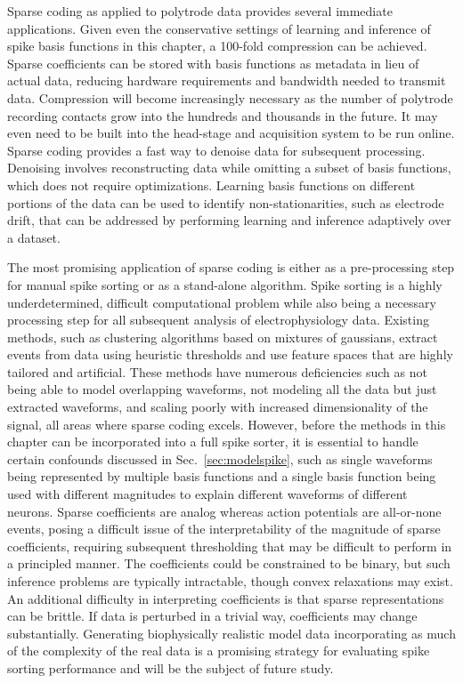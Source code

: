 Sparse coding as applied to polytrode data provides several  immediate
applications. Given even the conservative settings of learning and
inference of spike basis functions in this chapter, a 100-fold
compression can be achieved. Sparse coefficients can be stored with
basis functions as metadata in lieu of actual data, reducing hardware
requirements and bandwidth needed to transmit data. Compression will
become increasingly necessary as the number of polytrode recording
contacts grow into the hundreds and thousands in the future. It may
even need to be built into the head-stage and acquisition system to be
run online. Sparse coding provides a fast way to denoise data for
subsequent processing. Denoising involves reconstructing data while
omitting a subset of basis functions, which does not require
optimizations. Learning basis functions on different portions of the
data can be used to identify non-stationarities, such as electrode
drift, that can be addressed by performing learning and inference
adaptively over a dataset.

The most promising application of sparse coding is either as a
pre-processing step for manual spike sorting or as a stand-alone
algorithm. Spike sorting is a highly underdetermined, difficult
computational problem while also being a necessary processing step for
all subsequent analysis of electrophysiology data. Existing methods,
such as clustering algorithms based on mixtures of gaussians, extract
events from data using heuristic thresholds and use feature spaces
that are highly tailored and artificial. These methods have numerous
deficiencies such as not being able to model overlapping waveforms,
not modeling all the data but just extracted waveforms, and scaling
poorly with increased dimensionality of the signal, all areas where
sparse coding excels. However, before the methods in this chapter can
be incorporated into a full spike sorter, it is essential to handle
certain confounds discussed in Sec.~\ref{sec:modelspike}, such as
single waveforms being represented by multiple basis functions and a
single basis function being used with different magnitudes to explain
different waveforms of different neurons. Sparse coefficients are
analog whereas action potentials are all-or-none events, posing a
difficult issue of the interpretability of the magnitude of sparse
coefficients, requiring subsequent thresholding that may be difficult
to perform in a principled manner. The coefficients could be
constrained to be binary, but such inference problems are typically
intractable, though convex relaxations may exist. An additional
difficulty in interpreting coefficients is that sparse representations
can be brittle. If data is perturbed in a trivial way, coefficients
may change substantially. Generating biophysically realistic model
data incorporating as much of the complexity of the real data is a
promising strategy for evaluating spike sorting performance and will
be the subject of future study.

